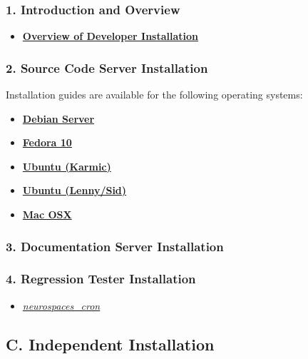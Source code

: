 \documentclass[12pt]{article}
\begin{document}
\subsubsection*{1. Introduction and Overview}

\begin{itemize}
   \item[]\href{../developer-installation/developer-installation.tex}{\bf Overview of Developer Installation}
\end{itemize}

\subsubsection*{2. Source Code Server Installation}

Installation guides are available for the following operating systems:
\begin{itemize}
    \item[]\href{../installation-debian-server/installation-debian-server.tex}{\bf Debian Server}
    \item[]\href{../installation-fedora10/installation-fedora10.tex}{\bf Fedora 10}
    \item[]\href{../installation-ubuntu-karmic/installation-ubuntu-karmic.tex}{\bf Ubuntu (Karmic)}
    \item[]\href{../installation-ubuntu-lennysid/installation-ubuntu-lennysid.tex}{\bf Ubuntu (Lenny/Sid)}
    \item[]\href{../installation-osx/installation-osx.tex}{\bf Mac OSX}
\end{itemize}   

\subsubsection*{3. Documentation Server Installation}

\subsubsection*{4. Regression Tester Installation}

\begin{itemize}
   \item[]\href{../neurospaces-cron/neurospaces-cron.tex}{\it neurospaces\_cron}
\end{itemize}

\subsection*{C. Independent Installation}
\end{document}
